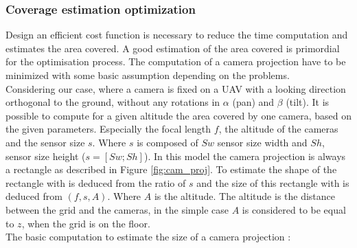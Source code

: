 \subsubsection{Coverage estimation optimization} 
Design an efficient cost function is necessary to reduce the time computation and estimates the area covered. A good estimation of the area covered is primordial for the optimisation process. 
  The computation of a camera projection have to be minimized with some basic assumption depending on the problems.\\
Considering our case, where a camera is fixed on a UAV with a looking direction orthogonal to the ground, without any rotations in $\alpha$ (pan) and $\beta$ (tilt). It is possible to compute for a given altitude the area covered by one camera, based on the given parameters. Especially the focal length $f$, the altitude of the cameras and the sensor size $s$. Where $s$ is composed of $Sw$ sensor size width and $Sh$, sensor size height ($s= [Sw ; Sh]$). 
In this model the camera projection is always a rectangle as described in Figure \ref{fig:cam_proj}. To estimate the shape of the rectangle with is deduced from the ratio of $s$ and the size of this rectangle with is deduced from $(f ,s ,A)$. Where $A$ is the altitude. The altitude is the distance between the grid and the cameras, in the simple case $A$ is considered to be equal to $z$, when the grid is on the floor.  \\
The basic computation to estimate the size of a camera projection :

